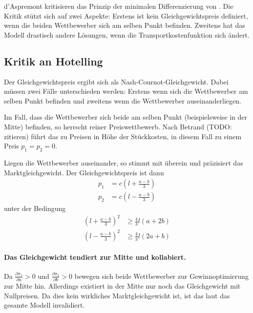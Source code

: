 d'Aspremont \citep{aspremont1979} kritisieren das Prinzip der minimalen Differenzierung von \citet{hotelling1929}.
Die Kritik stützt sich auf zwei Aspekte: Erstens ist kein Gleichgewichtspreis definiert, wenn die beiden Wettbewerber sich am selben Punkt befinden. Zweitens hat das Modell drastisch andere Lösungen, wenn die Transportkostenfunktion sich ändert. \citep[S.\,1145]{aspremont1979}

\subsection{Kritik an Hotelling}
Der Gleichgewichtspreis ergibt sich als Nash-Cournot-Gleichgewicht. Dabei müssen zwei Fälle unterschieden werden: Erstens wenn sich die Wettbewerber am selben Punkt befinden und zweitens wenn die Wettbewerber auseinanderliegen.

Im Fall, dass die Wettbewerber sich beide am selben Punkt (beispielsweise in der Mitte) befinden, so herrscht reiner Preiswettbewerb. Nach Betrand (TODO: zitieren) führt das zu Preisen in Höhe der Stückkosten, in diesem Fall zu einem Preis $p_1=p_2=0$.

Liegen die Wettbewerber auseinander, so stimmt \citet{aspremont1979} mit \citet{hotelling1929} überein und präzisiert das Marktgleichgewicht. Der Gleichgewichtspreis ist dann
\begin{equation}
\begin{split}
p_1 &= c \left(l+\frac{a-b}{3}\right) \\
p_2 &= c \left(l-\frac{a-b}{3}\right)
\end{split}
\end{equation}
unter der Bedingung
\begin{equation}
\begin{split}
\left(l+\frac{a-b}{3}\right)^2 &\geq \tfrac{4}{3} l (a+2b) \\
\left(l-\frac{a-b}{3}\right)^2 &\geq \tfrac{4}{3} l (2a+b)
\end{split}
\end{equation}

\paragraph{Das Gleichgewicht tendiert zur Mitte und kollabiert.} Da $\frac{\partial \pi_1}{\partial a}>0$ und $\frac{\partial \pi_2}{\partial b}>0$ bewegen sich beide Wettbewerber zur Gewinnoptimierung zur Mitte hin. Allerdings existiert in der Mitte nur noch das Gleichgewicht mit Nullpreisen. Da dies kein wirkliches Marktgleichgewicht ist, ist das laut \citet{aspremont1979} das gesamte Modell invalidiert.

